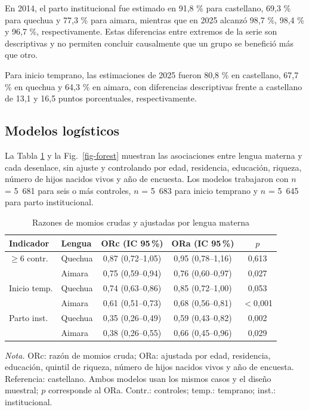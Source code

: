 \documentclass[
  spanish,
  letterpaper,
  conference]{IEEEtran}
\newcommand{\notatabla}[1]{\par\vspace{2pt}\parbox{\linewidth}{\footnotesize\emph{Nota.} #1}}
\begin{document}
En 2014, el parto institucional fue estimado en 91,8 \% para castellano,
69,3 \% para quechua y 77,3 \% para aimara, mientras que en 2025 alcanzó
98,7 \%, 98,4 \% y 96,7 \%, respectivamente. Estas diferencias entre
extremos de la serie son descriptivas y no permiten concluir causalmente
que un grupo se benefició más que otro.

Para inicio temprano, las estimaciones de 2025 fueron 80,8 \% en
castellano, 67,7 \% en quechua y 64,3 \% en aimara, con diferencias
descriptivas frente a castellano de 13,1 y 16,5 puntos porcentuales,
respectivamente.

\subsection{Modelos logísticos}\label{modelos-loguxedsticos}

La Tabla \ref{tab:ora} y la Fig.~\ref{fig-forest} muestran las
asociaciones entre lengua materna y cada desenlace, sin ajuste y
controlando por edad, residencia, educación, riqueza, número de hijos
nacidos vivos y año de encuesta. Los modelos trabajaron con \(n\) =
5~681 para seis o más controles, \(n\) = 5~683 para inicio temprano y
\(n\) = 5~645 para parto institucional.

\begin{table}[!t]
\centering
\caption{Razones de momios crudas y ajustadas por lengua materna}
\label{tab:ora}
\footnotesize
\setlength{\tabcolsep}{2pt}
\begin{tabular*}{\columnwidth}{@{\extracolsep{\fill}}llccc@{}}
\toprule
Indicador & Lengua & ORc (IC 95\,\%) & ORa (IC 95\,\%) & $p$ \\
\midrule
$\geq$6 contr. & Quechua & 0,87 (0,72--1,05) & 0,95 (0,78--1,16) & 0,613 \\
 & Aimara & 0,75 (0,59--0,94) & 0,76 (0,60--0,97) & 0,027 \\
\addlinespace
Inicio temp. & Quechua & 0,74 (0,63--0,86) & 0,85 (0,72--1,00) & 0,053 \\
 & Aimara & 0,61 (0,51--0,73) & 0,68 (0,56--0,81) & $<$0,001 \\
\addlinespace
Parto inst. & Quechua & 0,35 (0,26--0,49) & 0,59 (0,43--0,82) & 0,002 \\
 & Aimara & 0,38 (0,26--0,55) & 0,66 (0,45--0,96) & 0,029 \\
\bottomrule
\end{tabular*}
\notatabla{ORc: razón de momios cruda; ORa: ajustada por edad, residencia, educación, quintil de riqueza, número de hijos nacidos vivos y año de encuesta. Referencia: castellano. Ambos modelos usan los mismos casos y el diseño muestral; $p$ corresponde al ORa. Contr.: controles; temp.: temprano; inst.: institucional.}
\end{table}
\end{document}
